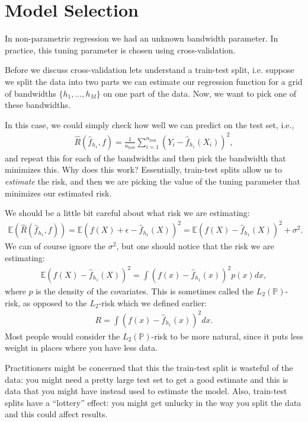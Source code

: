 \documentclass[twoside,12pt]{article}
\begin{document}
\section{Model Selection}
In non-parametric regression we had an unknown
bandwidth parameter. In practice, this tuning parameter is chosen using cross-validation.

Before we discuss cross-validation lets understand a train-test split, i.e. suppose
we split the data into two parts we can estimate our regression function for a grid of 
bandwidths $\{h_1,\ldots, h_M\}$ on one part of the data. 
Now, we want to pick one of these bandwidths.

In this case, we could simply check how well we can predict on the test set, i.e.,
\begin{align*}
\widehat{R}(\widehat{f}_{h_1}, f) = \frac{1}{n_{\text{test}}} \sum_{i=1}^{n_{\text{test}}} (Y_i - \widehat{f}_{h_1}(X_i))^2,
\end{align*}
and repeat this for each of the bandwidths and then pick the bandwidth that minimizes this.
Why does this work? Essentially, train-test splits allow us to \emph{estimate} the risk, and then we are picking the value of the tuning parameter that minimizes our estimated risk.

We should be a little bit careful about what risk we are estimating:
\begin{align*}
\mathbb{E}(\widehat{R}(\widehat{f}_{h_1}, f)) = \mathbb{E} (f(X) + \epsilon - \widehat{f}_{h_1}(X))^2 
= \mathbb{E} (f(X) - \widehat{f}_{h_1}(X))^2 + \sigma^2. 
\end{align*}
We can of course ignore the $\sigma^2$, but one should notice that the risk we are estimating:
\begin{align*}
\mathbb{E} (f(X) - \widehat{f}_{h_1}(X))^2 = \int (f(x) - \widehat{f}_{h_1}(x))^2 p(x) dx,
\end{align*}
where $p$ is the density of the covariates. This is sometimes called the $L_2(\mathbb{P})$-risk,
as opposed to the $L_2$-risk which we defined earlier:
\begin{align*}
R = \int (f(x) - \widehat{f}_{h_1}(x))^2  dx.
\end{align*}
Most people would consider the $L_2(\mathbb{P})$-risk to be more natural, since it puts less weight
in places where you have less data. 

Practitioners might be concerned that this the train-test split is wasteful of the data: you might need a pretty large test set to get a good estimate and this is data that you might have instead used to estimate the model.
Also, train-test splits have a ``lottery'' effect: you might get unlucky in the way you split the data and this could affect results. 
\end{document}
